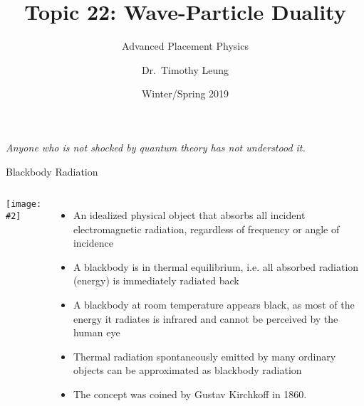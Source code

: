 \documentclass[12pt,compress,aspectratio=169]{beamer}
\title[Quantum]{Topic 22: Wave-Particle Duality}
\subtitle{Advanced Placement Physics}
\author[TML]{Dr.\ Timothy Leung}
\institute{Olympiads School}
\date{Winter/Spring 2019}
\newcommand{\pic}[2]{\texttt{[image: \#2]}}
\begin{document}
\begin{frame}
  \maketitle
\end{frame}


\begin{frame}{}
  \begin{center}
    \emph{Anyone who is not shocked by quantum theory has not understood it.}

    \vspace{.2in}
    \hspace{4in}{- Niels Bohr}
  \end{center}
\end{frame}


\begin{frame}{Blackbody Radiation}
  \begin{columns}
    \pic{1.2}{Black-body_realization.png}

    \begin{itemize}
    \item An idealized physical object that absorbs all incident electromagnetic
      radiation, regardless of frequency or angle of incidence
    \item A blackbody is in thermal equilibrium, i.e. all absorbed radiation
      (energy) is immediately radiated back
    \item A blackbody at room temperature appears black, as most of the energy
      it radiates is infrared and cannot be perceived by the human eye
    \item Thermal radiation spontaneously emitted by many ordinary objects can
      be approximated as blackbody radiation 
    \item The concept was coined by Gustav Kirchkoff in 1860.
    \end{itemize}
  \end{columns}
\end{frame}
\end{document}
